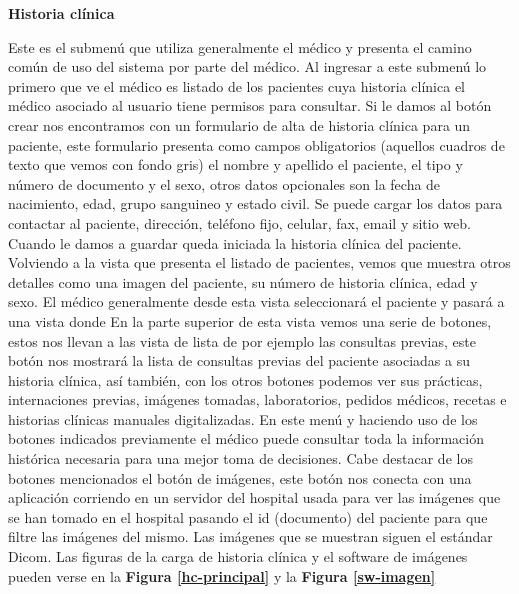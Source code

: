\textbf{Historia clínica}

Este es el submenú que utiliza generalmente el médico y presenta el camino común de uso del sistema por parte del médico. Al ingresar a este submenú lo primero que ve el médico es listado de los pacientes cuya historia clínica el médico asociado al usuario tiene permisos para consultar.
Si le damos al botón crear nos encontramos con un formulario de alta de historia clínica para un paciente, este formulario presenta como campos obligatorios (aquellos cuadros de texto que vemos con fondo gris) el nombre y apellido el paciente, el tipo y número de documento y el sexo, otros datos opcionales son la fecha de nacimiento, edad, grupo sanguineo y estado civil. Se puede cargar los datos para contactar al paciente, dirección, teléfono fijo, celular, fax, email y sitio web. Cuando le damos a guardar queda iniciada la historia clínica del paciente.
Volviendo a la vista que presenta el listado de pacientes, vemos que muestra otros detalles como una imagen del paciente, su número de historia clínica, edad y sexo. El médico generalmente desde esta vista seleccionará el paciente y pasará a una vista donde
En la parte superior de esta vista vemos una serie de botones, estos nos llevan a las vista de lista de por ejemplo las consultas previas, este botón nos mostrará la lista de consultas previas del paciente asociadas a su historia clínica, así también, con los otros botones podemos ver sus prácticas, internaciones previas, imágenes tomadas, laboratorios, pedidos médicos, recetas e historias clínicas manuales digitalizadas. En este menú y haciendo uso de los botones indicados previamente el médico puede consultar toda la información histórica necesaria para una mejor toma de decisiones. 
Cabe destacar de los botones mencionados el botón de imágenes, este botón nos conecta con una aplicación corriendo en un servidor del hospital usada para ver las imágenes que se han tomado en el hospital pasando el id (documento) del paciente para que filtre las imágenes del mismo. Las imágenes que se muestran siguen el estándar Dicom. Las figuras de la carga de historia clínica y el software de imágenes pueden verse en la \textbf{Figura \ref{hc-principal}} y la \textbf{Figura \ref{sw-imagen}}

